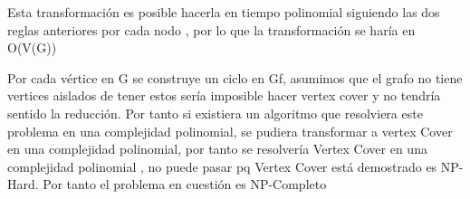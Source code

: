 \documentclass{article}
\begin{document}
\begin{minipage}{0.45\textwidth}
    \centering
\end{minipage}
\hfill
\begin{minipage}{0.45\textwidth}
    \centering
\end{minipage}
Esta transformación es posible hacerla en tiempo polinomial siguiendo las dos reglas anteriores por cada nodo , por lo que la transformación se haría en O(V(G))

Por cada vértice en G se construye un ciclo en Gf, asumimos que el grafo no tiene vertices aislados de tener estos sería imposible hacer vertex cover y no tendría sentido la reducción. Por tanto si existiera un algoritmo que resolviera este problema en una complejidad polinomial, se pudiera transformar a vertex Cover en una complejidad polinomial, por tanto se resolvería Vertex Cover en una complejidad polinomial , no puede pasar pq Vertex Cover está demostrado es NP-Hard. Por tanto el problema en cuestión es NP-Completo
\end{document}
